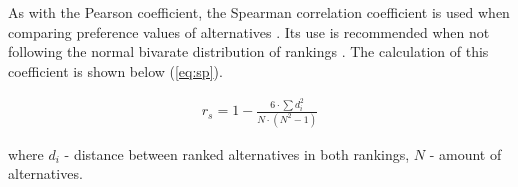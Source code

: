 As with the Pearson coefficient, the Spearman correlation coefficient is used when comparing preference values of alternatives \cite{myers2004spearman}. Its use is recommended when not following the normal bivarate distribution of rankings \cite{hauke2011comparison}. The calculation of this coefficient is shown below (\ref{eq:sp}).

\begin{equation}
\begin{array}{lcl}
r_{s}=1-\frac{6 \cdot \sum d_{i}^{2}}{N \cdot\left(N^{2}-1\right)}
\end{array}
\label{eq:sp}
\end{equation}

where $d_i$ - distance between ranked alternatives in both rankings, $N$ - amount of alternatives.